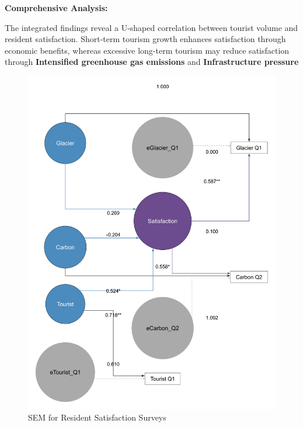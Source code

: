 \documentclass{mcmthesis}
\begin{document}
\textbf{Comprehensive Analysis:}\par
The integrated findings reveal a U-shaped correlation between tourist volume and resident satisfaction. Short-term tourism growth enhances satisfaction through economic benefits, whereas excessive long-term tourism may reduce satisfaction through \textbf{Intensified greenhouse gas emissions} and \textbf{Infrastructure pressure} 
\begin{figure}[h!] 
  \centering
  \includegraphics[width=12cm]{sem_diagram_final.pdf}
  \caption{SEM for Resident Satisfaction Surveys} \label{fig:sem}
\end{figure}
\end{document}
